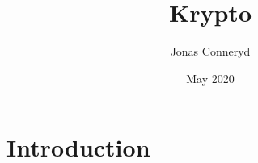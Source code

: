 \documentclass{article}
\title{Krypto}
\author{Jonas Conneryd}
\date{May 2020}
\begin{document}
\maketitle

\section{Introduction}
\end{document}
